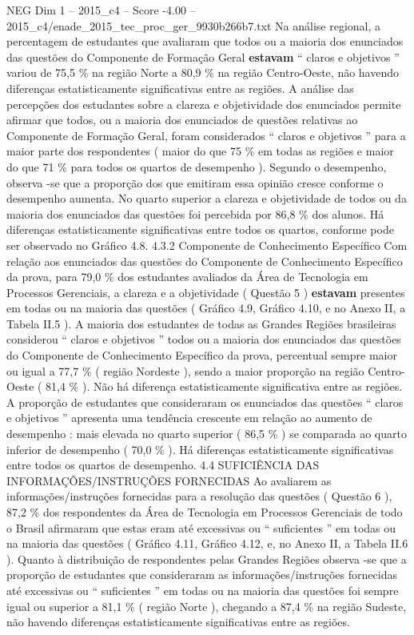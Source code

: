 \begin{textsample}{NEG Dim 1 – 2015\_c4 – Score -4.00 – 2015\_c4/enade\_2015\_tec\_proc\_ger\_9930b266b7.txt}
Na análise regional, a percentagem de estudantes que avaliaram que todos ou a maioria dos enunciados das questões do Componente de Formação Geral \textbf{estavam} “ claros e objetivos ” variou de 75,5 \% na região Norte a 80,9 \% na região Centro-Oeste, não havendo diferenças estatisticamente significativas entre as regiões.
A análise das percepções dos estudantes sobre a clareza e objetividade dos enunciados permite afirmar que todos, ou a maioria dos enunciados de questões relativas ao Componente de Formação Geral, foram considerados “ claros e objetivos ” para a maior parte dos respondentes ( maior do que 75 \% em todas as regiões e maior do que 71 \% para todos os quartos de desempenho ).
Segundo o desempenho, observa -se que a proporção dos que emitiram essa opinião cresce conforme o desempenho aumenta.
No quarto superior a clareza e objetividade de todos ou da maioria dos enunciados das questões foi percebida por 86,8 \% dos alunos.
Há diferenças estatisticamente significativas entre todos os quartos, conforme pode ser observado no Gráfico 4.8. 4.3.2 Componente de Conhecimento Específico Com relação aos enunciados das questões do Componente de Conhecimento Específico da prova, para 79,0 \% dos estudantes avaliados da Área de Tecnologia em Processos Gerenciais, a clareza e a objetividade ( Questão 5 ) \textbf{estavam} presentes em todas ou na maioria das questões ( Gráfico 4.9, Gráfico 4.10, e no Anexo II, a Tabela II.5 ).
A maioria dos estudantes de todas as Grandes Regiões brasileiras considerou “ claros e objetivos ” todos ou a maioria dos enunciados das questões do Componente de Conhecimento Específico da prova, percentual sempre maior ou igual a 77,7 \% ( região Nordeste ), sendo a maior proporção na região Centro-Oeste ( 81,4 \% ).
Não há diferença estatisticamente significativa entre as regiões.
A proporção de estudantes que consideraram os enunciados das questões “ claros e objetivos ” apresenta uma tendência crescente em relação ao aumento de desempenho : mais elevada no quarto superior ( 86,5 \% ) se comparada ao quarto inferior de desempenho ( 70,0 \% ).
Há diferenças estatisticamente significativas entre todos os quartos de desempenho. 4.4 SUFICIÊNCIA DAS INFORMAÇÕES/INSTRUÇÕES FORNECIDAS Ao avaliarem as informações/instruções fornecidas para a resolução das questões ( Questão 6 ), 87,2 \% dos respondentes da Área de Tecnologia em Processos Gerenciais de todo o Brasil afirmaram que estas eram até excessivas ou “ suficientes ” em todas ou na maioria das questões ( Gráfico 4.11, Gráfico 4.12, e, no Anexo II, a Tabela II.6 ).
Quanto à distribuição de respondentes pelas Grandes Regiões observa -se que a proporção de estudantes que consideraram as informações/instruções fornecidas até excessivas ou “ suficientes ” em todas ou na maioria das questões foi sempre igual ou superior a 81,1 \% ( região Norte ), chegando a 87,4 \% na região Sudeste, não havendo diferenças estatisticamente significativas entre as regiões.

\end{textsample}
